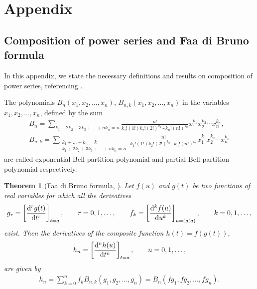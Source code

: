 \documentclass[11pt]{article}
\numberwithin{equation}{section}
\numberwithin{equation}{section}
\newtheorem{Theorem}{Theorem}[section]
\begin{document}
\appendix
\section{Appendix}


\subsection{Composition of power series and Faa di Bruno formula}

In this appendix, we state the necessary definitions and results on composition of power series, referencing \cite[Chapter~11]{Charalambides}.

\begin{Definition}
The polynomials $B_n(x_1,x_2,\dots,x_n)$, $B_{n,k}(x_1,x_2,\dots,x_n)$ in the variables~${x_1,x_2,\dots,x_n}$, defined by the sum
\begin{gather}
B_{n}=\sum_{ k_1+2k_2+3k_3+\dots +nk_{n}=n} \frac{n!}{k_1!(1!)k_2!(2!)^{k_2}\cdots k_n!(n!)^{k_n}} x_1^{k_1}x_2^{k_2}\cdots x_n^{k_n},\nonumber\\
B_{n,k}=\sum_{\substack{ k_1+\dots +k_n=k\\ k_1+2k_2+3k_3+\dots +nk_{n}=n}} \frac{n!}{k_1!(1!)k_2!(2!)^{k_2}\cdots k_n!(n!)^{k_n}} x_1^{k_1}x_2^{k_2}\cdots x_n^{k_n}\label{Bell polynomials}
\end{gather}
 are called exponential Bell partition polynomial and partial Bell partition polynomial respectively.
\end{Definition}


\begin{Theorem}[Faa di Bruno formula, \cite{Charalambides}]
Let $f(u)$ and $g(t)$ be two functions of real variables for which all the derivatives
\begin{gather*}
g_r=\left[\frac{{\rm d}^rg(t)}{{\rm d}t^r}\right]_{t=a}, \qquad r=0,1,\dots, \qquad f_k=\left[\frac{{\rm d}^kf(u)}{{\rm d}u^k}\right]_{u=(g(a)}, \qquad k=0,1,\dots,
\end{gather*}
exist. Then the derivatives of the composite function $h(t)= f(g(t))$,
\begin{gather*}
h_n=\left[\frac{{\rm d}^nh(u)}{{\rm d}t^n}\right]_{t=a}, \qquad n=0,1,\dots,
\end{gather*}
are given by
\begin{gather}
h_n=\sum_{k=0}^n f_kB_{n,k}(g_1,g_2,\dots,g_n)=B_n(fg_1,fg_2,\dots,fg_n).\label{Faa di Bruno}
\end{gather}
\end{Theorem}
\end{document}
